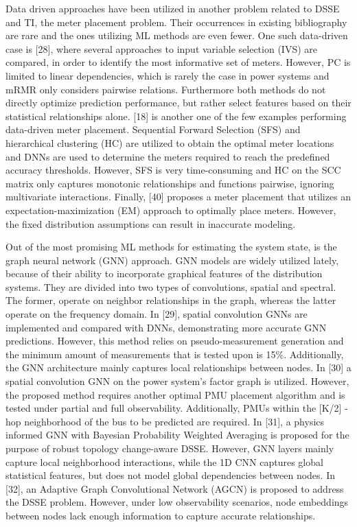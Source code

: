 \documentclass[journal]{IEEEtran}  %
\begin{document}
Data driven approaches have been utilized in another problem related to DSSE and TI, the meter placement problem. Their occurrences in existing bibliography are rare and the ones utilizing ML methods are even fewer. One such data-driven case is [28], where several approaches to input variable selection (IVS) are compared, in order to identify the most informative set of meters. However, PC is limited to linear dependencies, which is rarely the case in power systems and mRMR only considers pairwise relations. Furthermore both methods do not directly optimize prediction performance, but rather select features based on their statistical relationships alone. [18] is another one of the few examples performing data-driven meter placement. Sequential Forward Selection (SFS) and hierarchical clustering (HC) are utilized to obtain the optimal meter locations and DNNs are used to determine the meters required to reach the predefined accuracy thresholds. However, SFS is very time-consuming and HC on the SCC matrix only captures monotonic relationships and functions pairwise, ignoring multivariate interactions. Finally, [40] proposes a meter placement that utilizes an expectation-maximization (EM) approach to optimally place meters. However, the fixed distribution assumptions can result in inaccurate modeling.


Out of the most promising ML methods for estimating the system state, is the graph neural network (GNN) approach. GNN models are widely utilized lately, because of their ability to incorporate graphical features of the distribution systems. They are divided into two types of convolutions, spatial and spectral. The former, operate on neighbor relationships in the graph, whereas the latter operate on the frequency domain. In [29], spatial convolution GNNs are implemented and compared with DNNs, demonstrating more accurate GNN predictions. However, this method relies on pseudo-measurement generation and the minimum amount of measurements that is tested upon is 15\%. Additionally, the GNN architecture mainly captures local relationships between nodes. In [30] a spatial convolution GNN on the power system's factor graph is utilized. However, the proposed method requires another optimal PMU placement algorithm and is tested under partial and full observability. Additionally, PMUs within the [K/2] - hop neighborhood of the bus to be predicted are required. In [31], a physics informed GNN with Bayesian Probability Weighted Averaging is proposed for the purpose of robust topology change-aware DSSE. However, GNN layers mainly capture local neighborhood interactions, while the 1D CNN captures global statistical features, but does not model global dependencies between nodes. In [32], an Adaptive Graph Convolutional Network (AGCN) is proposed to address the DSSE problem. However, under low observability scenarios, node embeddings between nodes lack enough information to capture accurate relationships.
\end{document}
